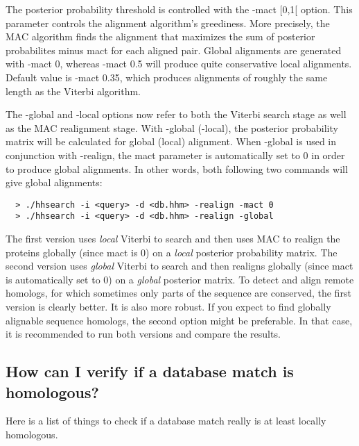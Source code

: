 \documentclass[11pt,a4paper]{article}
\begin{document}
The posterior probability threshold is controlled with the -mact [0,1[ option. 
This parameter controls the alignment algorithm's greediness. More precisely, the 
MAC algorithm finds the alignment that maximizes the sum of posterior probabilites 
minus mact for each aligned pair. Global alignments are generated with -mact 0, 
whereas -mact 0.5 will produce quite conservative local alignments. Default value is 
-mact 0.35, which produces alignments of roughly the same length as the Viterbi 
algorithm. 

The -global and -local options now refer to both the Viterbi search stage as 
well as the MAC realignment stage. With -global (-local), the posterior probability 
matrix will be calculated for global (local) alignment. When -global is used in 
conjunction with -realign, the mact parameter is automatically set to 0 in order to 
produce global alignments. In other words, both following two commands will give 
global alignments:
\begin{verbatim}
  > ./hhsearch -i <query> -d <db.hhm> -realign -mact 0
  > ./hhsearch -i <query> -d <db.hhm> -realign -global
\end{verbatim}

The first version uses \emph{local} Viterbi to search and then uses MAC to realign the 
proteins globally (since mact is 0) on a \emph{local} posterior probability matrix. The 
second version uses \emph{global} Viterbi to search and then realigns globally (since mact 
is automatically set to 0) on a \emph{global} posterior matrix. To detect and align remote 
homologs, for which sometimes only parts of the sequence are conserved, the first 
version is clearly better. It is also more robust. If you expect to find globally 
alignable sequence homologs, the second option might be preferable. In that case, 
it is recommended to run both versions and compare the results. 


\subsection{How can I verify if a database match is homologous?}

Here is a list of things to check if a database match really is at least locally homologous.
 
\end{document}

